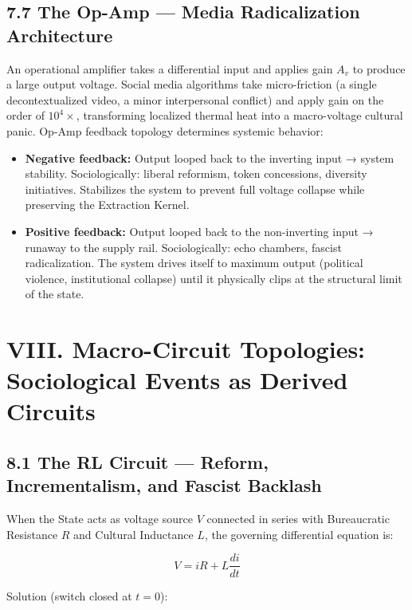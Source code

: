 \documentclass[12pt]{book}
\numberwithin{equation}{chapter}
\begin{document}
\subsection{7.7 The Op-Amp — Media Radicalization Architecture}

    An operational amplifier takes a differential input and applies gain $A_v$ to produce a large output voltage. Social media algorithms take micro-friction (a single decontextualized video, a minor interpersonal conflict) and apply gain on the order of $10^4\times$, transforming localized thermal heat into a macro-voltage cultural panic. Op-Amp feedback topology determines systemic behavior:
  

\begin{itemize}

\item \textbf{Negative feedback:} Output looped back to the inverting input → system stability. Sociologically: liberal reformism, token concessions, diversity initiatives. Stabilizes the system to prevent full voltage collapse while preserving the Extraction Kernel.

\item \textbf{Positive feedback:} Output looped back to the non-inverting input → runaway to the supply rail. Sociologically: echo chambers, fascist radicalization. The system drives itself to maximum output (political violence, institutional collapse) until it physically clips at the structural limit of the state.

\end{itemize}

\section{VIII. Macro-Circuit Topologies: Sociological Events as Derived Circuits}

\subsection{8.1 The RL Circuit — Reform, Incrementalism, and Fascist Backlash}

    When the State acts as voltage source $V$ connected in series with Bureaucratic Resistance $R$ and Cultural Inductance $L$, the governing differential equation is:
  

\begin{equation}
 V = iR + L\frac{di}{dt} 
\end{equation}

Solution (switch closed at $t = 0$):
\end{document}
